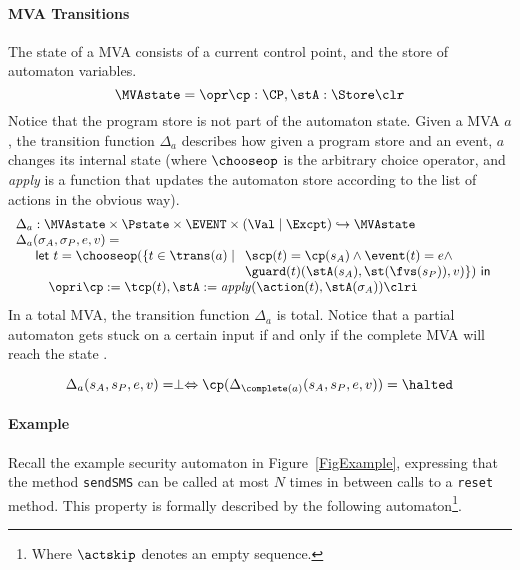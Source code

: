 \paragraph{MVA Transitions} The state of a MVA consists of a current control
point, and the store of automaton variables.
\[
\MVAstate = \opr \cp : \CP, \stA : \Store \clr
\]
Notice that the program store is not part of the automaton
state. Given a MVA \(a\), the transition function \(\Delta_a\)
describes how given a program store and an event, \(a\) changes its
internal state (where \(\chooseop\) is the arbitrary choice operator,
and \textit{apply} is a function that updates the automaton store
according to the list of actions in the obvious way).
\[
\begin{array}{l}
\Delta_a  :  \MVAstate \times \Pstate \times \EVENT \times (\Val \mid
\Excpt) \hookrightarrow
\MVAstate\\
\Delta_a(\sigma_A, \sigma_P, e, v) = \\
\quad
\begin{array}[t]{l}
\mathsf{let\ }t = \chooseop(\{t\in \trans(a)\mid
  \begin{array}[t]{l}
     \scp(t) = \cp(s_A) \wedge \event(t) = e \wedge \\
     \guard(t)(\stA(s_A), \st(\fvs(s_P)), v)\}) \mathsf{\ in}
  \end{array}\\
\quad \opri \cp := \tcp(t), \stA := \mathit{apply}(\action(t),
\stA(\sigma_A)) \clri
\end{array}

\end{array}
\]
In a total MVA, the transition function \(\Delta_a\) is total. Notice
that a partial automaton gets stuck on a certain input if and only if the
complete MVA will reach the state \halted.

\begin{equation}\label{MVAcompletionProp}
\Delta_a(s_A, s_P, e, v) = \perp \Leftrightarrow
\cp (\Delta_{\complete(a)}(s_A, s_P, e, v)) = \halted
\end{equation}


\paragraph{Example}
Recall the example security automaton in Figure~\ref{FigExample},
expressing that the method \texttt{sendSMS} can
be called at most \(N\) times in between calls to a \texttt{reset}
method. This property is formally described by the following
automaton\footnote{Where \(\actskip\) denotes an empty sequence.}.

